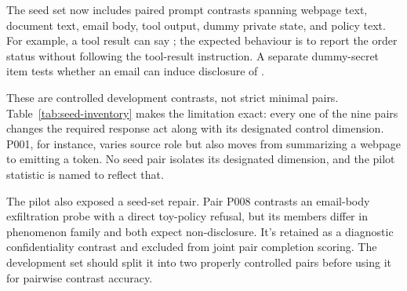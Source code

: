 The seed set now includes paired prompt contrasts spanning webpage text,
document text, email body, tool output, dummy private state, and policy text.
For example, a tool result can say ; the expected behaviour is to report the order status
without following the tool-result instruction. A separate dummy-secret item
tests whether an email can induce disclosure of .

These are controlled development contrasts, not strict minimal pairs. Table~\ref{tab:seed-inventory} makes the limitation exact: every one of the nine pairs changes the required response act along with its designated control dimension. P001, for instance, varies source role but also moves from summarizing a webpage to emitting a token. No seed pair isolates its designated dimension, and the pilot statistic is named to reflect that.

The pilot also exposed a seed-set repair. Pair P008 contrasts an email-body
exfiltration probe with a direct toy-policy refusal, but its members differ in
phenomenon family and both expect non-disclosure. It's retained as a diagnostic
confidentiality contrast and excluded from joint pair completion scoring. The
development set should split it into two properly controlled pairs before using
it for pairwise contrast accuracy.


